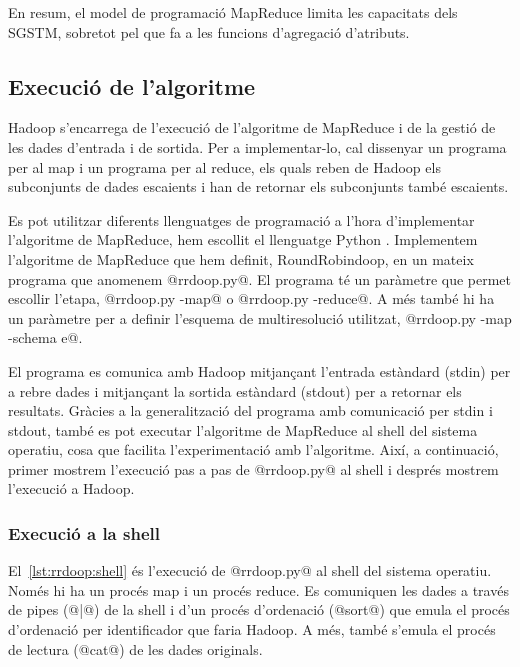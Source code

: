 En resum, el model de programació MapReduce limita les capacitats dels
\gls{SGSTM}, sobretot pel que fa a les funcions d'agregació
d'atributs. 






\subsection{Execució de l'algoritme}


Hadoop s'encarrega de l'execució de l'algoritme de MapReduce i de la
gestió de les dades d'entrada i de sortida.  Per a implementar-lo, cal
dissenyar un programa per al map i un programa per al reduce, els
quals reben de Hadoop els subconjunts de dades escaients i han de
retornar els subconjunts també escaients.  

Es pot utilitzar diferents llenguatges de programació a l'hora
d'implementar l'algoritme de MapReduce, hem escollit el llenguatge
Python \parencite{python:doc2}.  Implementem l'algoritme de MapReduce
que hem definit, RoundRobindoop, en un mateix programa que anomenem
@rrdoop.py@. El programa té un paràmetre que permet escollir l'etapa,
@rrdoop.py -map@ o @rrdoop.py -reduce@. A més també hi ha un paràmetre
per a definir l'esquema de multiresolució utilitzat, %
@rrdoop.py -map -schema e@.

El programa es comunica amb Hadoop mitjançant l'entrada estàndard
(stdin) per a rebre dades i mitjançant la sortida estàndard (stdout)
per a retornar els resultats.  Gràcies a la generalització del
programa amb comunicació per stdin i stdout, també es pot executar
l'algoritme de MapReduce al shell del sistema operatiu, cosa que
facilita l'experimentació amb l'algoritme.  Així, a continuació,
primer mostrem l'execució pas a pas de @rrdoop.py@ al shell i després
mostrem l'execució a Hadoop.



\subsubsection{Execució a la shell}

El~\autoref{lst:rrdoop:shell} és l'execució de
@rrdoop.py@ al shell del sistema operatiu. Només hi ha un procés map i
un procés reduce. Es comuniquen les dades a través de pipes (@|@) de la
shell i d'un procés d'ordenació (@sort@) que emula el procés
d'ordenació per identificador que faria Hadoop. A més, també s'emula
el procés de lectura (@cat@) de les dades originals.

